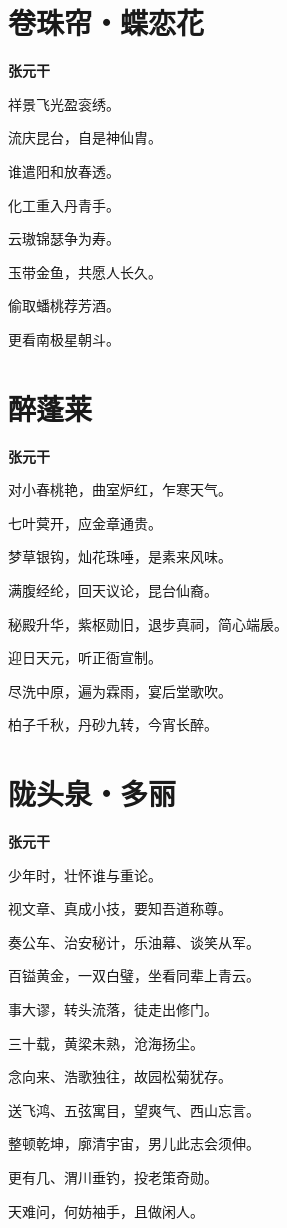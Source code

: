 \documentclass[12pt,a4paper]{ctexbook}
\begin{document}
\section{卷珠帘・蝶恋花}
\textbf{张元干}\par\vspace{0.5em}
祥景飞光盈衮绣。\par
流庆昆台，自是神仙胄。\par
谁遣阳和放春透。\par
化工重入丹青手。\par
云璈锦瑟争为寿。\par
玉带金鱼，共愿人长久。\par
偷取蟠桃荐芳酒。\par
更看南极星朝斗。\par

\section{醉蓬莱}
\textbf{张元干}\par\vspace{0.5em}
对小春桃艳，曲室炉红，乍寒天气。\par
七叶蓂开，应金章通贵。\par
梦草银钩，灿花珠唾，是素来风味。\par
满腹经纶，回天议论，昆台仙裔。\par
秘殿升华，紫枢勋旧，退步真祠，简心端扆。\par
迎日天元，听正衙宣制。\par
尽洗中原，遍为霖雨，宴后堂歌吹。\par
柏子千秋，丹砂九转，今宵长醉。\par

\section{陇头泉・多丽}
\textbf{张元干}\par\vspace{0.5em}
少年时，壮怀谁与重论。\par
视文章、真成小技，要知吾道称尊。\par
奏公车、治安秘计，乐油幕、谈笑从军。\par
百镒黄金，一双白璧，坐看同辈上青云。\par
事大谬，转头流落，徒走出修门。\par
三十载，黄梁未熟，沧海扬尘。\par
念向来、浩歌独往，故园松菊犹存。\par
送飞鸿、五弦寓目，望爽气、西山忘言。\par
整顿乾坤，廓清宇宙，男儿此志会须伸。\par
更有几、渭川垂钓，投老策奇勋。\par
天难问，何妨袖手，且做闲人。\par
\end{document}
